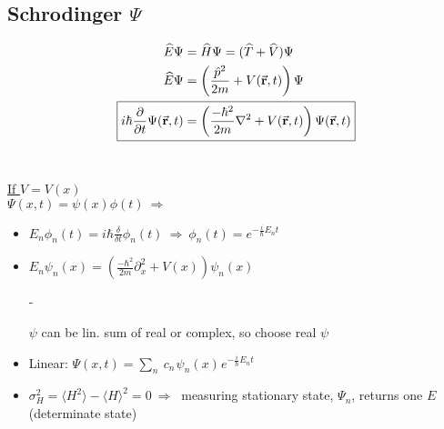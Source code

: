 \documentclass[12pt]{article}
\newcommand{\hs}{\hspace{1pt}} %
\begin{document}
\subsection{Schrodinger \( \Psi \)}
\unskip
\[ \begin{aligned}
    \widehat{E} \Psi &= \widehat{H} \Psi = ( \widehat{T} + \widehat{V} ) \Psi\\
    \widehat{E} \Psi 
        &= \left( \frac{ \hat{p}^2 }{2m} + V(\vec{\mathbf{r}},t) \right) \Psi\\
    \Aboxed{ i \hbar \frac{\partial}{\partial t} \Psi(\vec{\mathbf{r}},t) 
        &= \left( \frac{-\hbar^2}{2m} \nabla^2 
            + V(\vec{\mathbf{r}},t) \right) \Psi(\vec{\mathbf{r}},t) }
\end{aligned} \]\\[5pt]
\begin{minipage}[t]{.49\textwidth}
    \underline{If \(V=V(x)\)}\\[10pt]
    \(\Psi(x,t) = \psi(x)\phi(t) \ \Rightarrow\)
    \begin{itemize}
        \item \( E_n \phi_n(t) = i \hbar \frac{\delta}{\delta t} \phi_n(t) \ \Rightarrow \ 
            \boxed{ \phi_n(t) = e^{- \frac{i}{\hbar} E_n t} } \)\\
        \item \( \boxed{ E_n \psi_n(x) 
            = \left( \frac{-\hbar^2}{2m} \partial_x^2 + V(x) \right) \psi_n(x) } \)\\
        \item[-] \begin{itemize}
                \(\psi\) can be lin. sum of real or complex, so choose real \(\psi\)
            \end{itemize}
        \item Linear: \( \boxed{ \Psi(x,t) 
            = \sum_n \ c_n \hs \psi_n(x) \hs e^{- \frac{i}{\hbar} E_n t} } \)\\
        \item \(\sigma^2_H = \langle H^2\rangle - \langle H \rangle^2  = 0
            \ \Rightarrow \ \) measuring stationary state, \(\Psi_n\), returns one \(E\) 
            (determinate state)
    \end{itemize}
\end{minipage}
\hspace{10pt}
\end{document}
